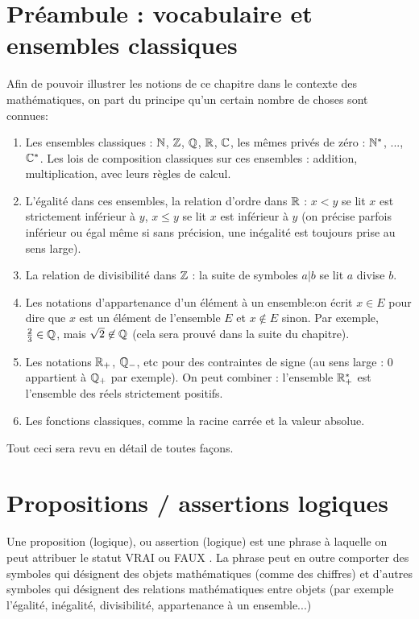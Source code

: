 
\section{Préambule : vocabulaire et ensembles classiques}
Afin de pouvoir illustrer les notions de ce chapitre dans le contexte des mathématiques, on part du principe qu'un certain nombre de choses sont connues:

\begin{enumerate}
\item Les ensembles classiques :  $\mathbb{N}$, $\mathbb{Z}$, $\mathbb{Q}$, $\mathbb{R}$, $\mathbb{C}$, les mêmes privés de zéro : $\mathbb{N}^*$, ..., $\mathbb{C}^*$. Les lois de composition classiques sur ces ensembles : addition, multiplication, avec leurs règles de calcul.
\item L'égalité dans ces ensembles, la relation d'ordre dans $\mathbb{R}$ : $x< y$ se lit \og$x$ est strictement inférieur à $y$\fg, $x\leq y$ se lit \og $x$ est inférieur à $y$\fg{} (on précise parfois \og inférieur ou égal\fg{} même si sans précision, une inégalité est toujours prise au sens large).
\item La relation de divisibilité dans $\mathbb{Z}$ : la suite de symboles $a|b$ se lit \og $a$ divise $b$\fg.
\item Les notations d'appartenance d'un élément à un ensemble:on écrit $x \in E$ pour dire que $x$ est un élément de l'ensemble $E$ et $x\not\in E$ sinon. Par exemple, $\frac23 \in \mathbb{Q}$, mais $\sqrt{2} \not\in\mathbb{Q}$ (cela sera prouvé dans la suite du chapitre). 
\item Les notations $\mathbb{R}_+$, $\mathbb{Q}_-$, etc pour des contraintes de signe (au sens large : $0$ appartient à $\mathbb{Q}_+$ par exemple). On peut combiner : l'ensemble $\mathbb{R}_+^*$ est l'ensemble des réels strictement positifs. 
\item Les fonctions classiques, comme la racine carrée et la valeur absolue.
\end{enumerate}

Tout ceci sera revu en détail de toutes façons.


\section{Propositions / assertions logiques}

\begin{definition}
Une proposition (logique), ou assertion (logique) est une phrase à laquelle on peut attribuer le statut \og VRAI\fg{} ou \og FAUX \fg{}. La phrase peut en outre comporter des symboles qui désignent des objets mathématiques (comme des chiffres) et d'autres symboles qui désignent des relations mathématiques entre objets (par exemple l'égalité, inégalité, divisibilité, appartenance à un ensemble...)
\end{definition}

